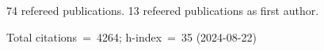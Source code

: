 74 refereed publications. 13 refeered publications as first author.

Total citations~=~4264; h-index~=~35 (2024-08-22)